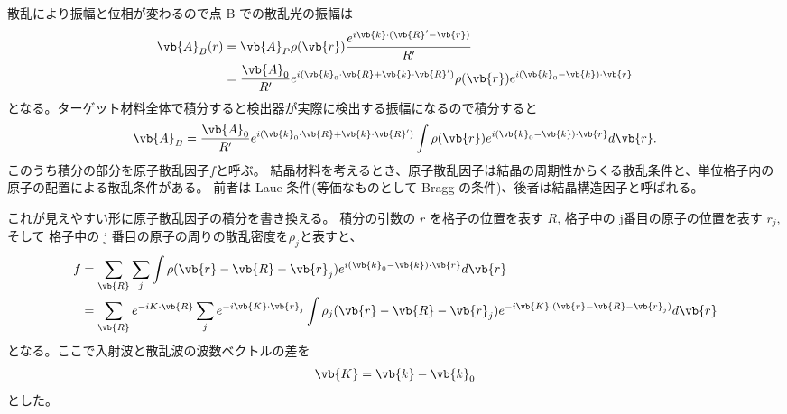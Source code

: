 \documentclass[11pt,dvipdfmx,a4paper]{jsarticle}
\begin{document}
散乱により振幅と位相が変わるので点 B での散乱光の振幅は
\begin{align}
	\vb{A}_B(r) &= \vb{A}_P \rho(\vb{r}) \frac{e^{i\vb{k}\cdot(\vb{R}'-\vb{r})}}{R'}\\
	&=\frac{\vb{A}_0}{R'}e^{i(\vb{k}_0 \cdot \vb{R}+ \vb{k} \cdot \vb{R}')}\rho(\vb{r})e^{i(\vb{k}_0-\vb{k})\cdot \vb{r}}
\end{align}
となる。ターゲット材料全体で積分すると検出器が実際に検出する振幅になるので積分すると
\begin{align}
	\vb{A}_B =\frac{\vb{A}_0}{R'}e^{i(\vb{k}_0 \cdot \vb{R}+ \vb{k} \cdot \vb{R}')}\int \rho(\vb{r}) e^{i(\vb{k}_0-\vb{k})\cdot \vb{r}} d\vb{r}.
\end{align}
このうち積分の部分を原子散乱因子\(f\)と呼ぶ。
結晶材料を考えるとき、原子散乱因子は結晶の周期性からくる散乱条件と、単位格子内の原子の配置による散乱条件がある。
前者は Laue 条件(等価なものとして Bragg の条件)、後者は結晶構造因子と呼ばれる。

これが見えやすい形に原子散乱因子の積分を書き換える。
積分の引数の \(r\) を格子の位置を表す \(R\), 格子中の j番目の原子の位置を表す \(r_j\), そして
格子中の j 番目の原子の周りの散乱密度を\(\rho_j\)と表すと、
\begin{align}
	f&=\sum_{\vb{R}} \sum_{j} \int\rho(\vb{r}-\vb{R}-\vb{r}_j)e^{i(\vb{k}_0-\vb{k})\cdot \vb{r}} d\vb{r}\\
	&=\sum_{\vb{R}} e^{-iK\cdot \vb{R}}\sum_j e^{-i\vb{K}\cdot \vb{r}_j} \int \rho_j(\vb{r}-\vb{R}-\vb{r}_j) e^{-i\vb{K}\cdot(\vb{r}-\vb{R}-\vb{r}_j)}d\vb{r}\label{factor_1}
\end{align}
となる。ここで入射波と散乱波の波数ベクトルの差を
\begin{align}
	\vb{K} = \vb{k} -\vb{k}_0
\end{align}
とした。
\end{document}
